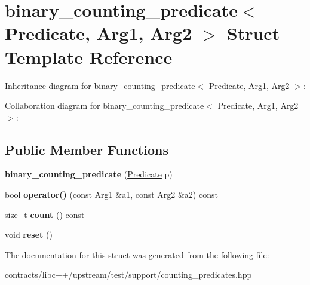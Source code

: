 \hypertarget{structbinary__counting__predicate}{}\section{binary\+\_\+counting\+\_\+predicate$<$ Predicate, Arg1, Arg2 $>$ Struct Template Reference}
\label{structbinary__counting__predicate}


Inheritance diagram for binary\+\_\+counting\+\_\+predicate$<$ Predicate, Arg1, Arg2 $>$\+:


Collaboration diagram for binary\+\_\+counting\+\_\+predicate$<$ Predicate, Arg1, Arg2 $>$\+:
\subsection*{Public Member Functions}
\begin{DoxyCompactItemize}
\item 
\mbox{\label{structbinary__counting__predicate_aaf81e9415356cbb2b4a3bbf8b3014fcf}} 
{\bfseries binary\+\_\+counting\+\_\+predicate} (\mbox{\hyperlink{structunary__counting__predicate}{Predicate}} p)
\item 
\mbox{\label{structbinary__counting__predicate_a4c8aa1219079f901cea19a0bff756614}} 
bool {\bfseries operator()} (const Arg1 \&a1, const Arg2 \&a2) const
\item 
\mbox{\label{structbinary__counting__predicate_a21f7ea83b0cea59b123c7a84eefc8de0}} 
size\+\_\+t {\bfseries count} () const
\item 
\mbox{\label{structbinary__counting__predicate_a7d293c4adcae234d1ecb3021ddfe21fe}} 
void {\bfseries reset} ()
\end{DoxyCompactItemize}


The documentation for this struct was generated from the following file\+:\begin{DoxyCompactItemize}
\item 
contracts/libc++/upstream/test/support/counting\+\_\+predicates.\+hpp\end{DoxyCompactItemize}
